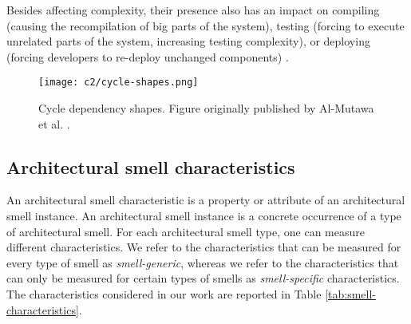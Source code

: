 Besides affecting complexity, their presence also has an impact on compiling (causing the recompilation of big parts of the system), testing (forcing to execute unrelated parts of the system, increasing testing complexity), or deploying (forcing developers to re-deploy unchanged components) \cite{Lippert2006}.

\begin{figure}
    \centering
    \texttt{[image: c2/cycle-shapes.png]}
    \caption{Cycle dependency shapes. Figure originally published by Al-Mutawa et al. \cite{AlMutawa2014}.}
    \label{c2:fig:cycle-dep} 
\end{figure}

\subsection{Architectural smell characteristics}\label{c2:sec:smell-characteristics}
An architectural smell characteristic is a property or attribute of an architectural smell instance. 
An architectural smell instance is a concrete occurrence of a type of architectural smell.
For each architectural smell type, one can measure different characteristics. We refer to the characteristics that can be measured for every type of smell as \emph{smell-generic}, whereas we refer to the characteristics that can only be measured for certain types of smells as \emph{smell-specific} characteristics.
The characteristics considered in our work are reported in Table \ref{tab:smell-characteristics}.

